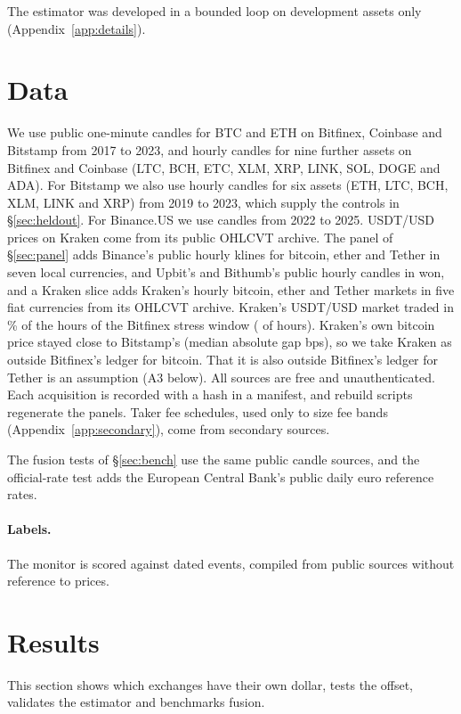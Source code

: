 \documentclass[sigconf,review,anonymous]{acmart}
\begin{document}
The estimator was developed in a bounded loop on development assets only (Appendix~\ref{app:details}).



\section{Data}
\label{sec:data}
We use public one-minute candles for BTC and ETH on Bitfinex, Coinbase and Bitstamp from 2017 to 2023, and hourly
candles for nine further assets on Bitfinex and Coinbase (LTC, BCH, ETC, XLM, XRP, LINK, SOL, DOGE and ADA). For
Bitstamp we also use hourly candles for six assets (ETH, LTC, BCH, XLM, LINK and XRP) from 2019 to 2023, which
supply the controls in \S\ref{sec:heldout}. For Binance.US we use candles from 2022 to 2025. USDT/USD prices on Kraken come from its public OHLCVT archive. The panel of \S\ref{sec:panel} adds Binance's public hourly
klines for bitcoin, ether and Tether in seven local currencies, and Upbit's and Bithumb's public hourly candles in won, and a Kraken slice adds Kraken's hourly bitcoin, ether and Tether markets in five fiat currencies from its OHLCVT archive. Kraken's USDT/USD market traded in \NumKCovSharePct\% of the hours of the
Bitfinex stress window (\NumKCovTraded{} of \NumKCovHours{} hours). Kraken's own bitcoin price stayed close to Bitstamp's
(median absolute gap \NumKStressKrakenBtcGapMedAbs{} bps), so we take Kraken as outside Bitfinex's ledger for bitcoin. That
it is also outside Bitfinex's ledger for Tether is an assumption (A3 below). All sources are free and unauthenticated. Each acquisition is recorded with a hash in a manifest, and rebuild scripts
regenerate the panels. Taker fee schedules, used only to size fee bands (Appendix~\ref{app:secondary}), come from
secondary sources.

The fusion tests of \S\ref{sec:bench} use the same public candle sources, and the official-rate test adds the European Central Bank's public daily euro reference rates.

\paragraph{Labels.} The monitor is scored against \NumULabels{} dated events, compiled from public sources without reference to prices.

\section{Results}
This section shows which exchanges have their own dollar, tests the offset, validates the estimator and benchmarks fusion.
\end{document}

